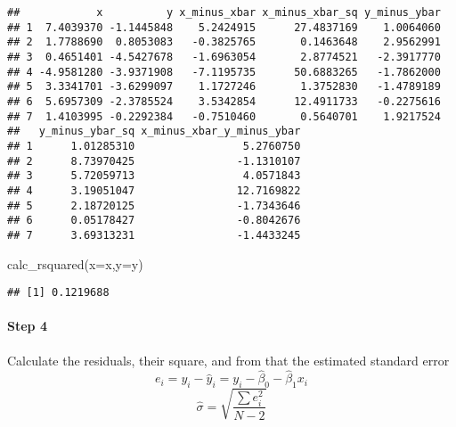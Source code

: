\documentclass[
]{article}
\newenvironment{Shaded}{\begin{snugshade}}{\end{snugshade}}
\newcommand{\AttributeTok}[1]{\textcolor[rgb]{0.77,0.63,0.00}{#1}}
\newcommand{\CommentTok}[1]{\textcolor[rgb]{0.56,0.35,0.01}{\textit{#1}}}
\newcommand{\FunctionTok}[1]{\textcolor[rgb]{0.00,0.00,0.00}{#1}}
\newcommand{\NormalTok}[1]{#1}
\begin{document}
\begin{verbatim}
##            x          y x_minus_xbar x_minus_xbar_sq y_minus_ybar
## 1  7.4039370 -1.1445848    5.2424915      27.4837169    1.0064060
## 2  1.7788690  0.8053083   -0.3825765       0.1463648    2.9562991
## 3  0.4651401 -4.5427678   -1.6963054       2.8774521   -2.3917770
## 4 -4.9581280 -3.9371908   -7.1195735      50.6883265   -1.7862000
## 5  3.3341701 -3.6299097    1.1727246       1.3752830   -1.4789189
## 6  5.6957309 -2.3785524    3.5342854      12.4911733   -0.2275616
## 7  1.4103995 -0.2292384   -0.7510460       0.5640701    1.9217524
##   y_minus_ybar_sq x_minus_xbar_y_minus_ybar
## 1      1.01285310                 5.2760750
## 2      8.73970425                -1.1310107
## 3      5.72059713                 4.0571843
## 4      3.19051047                12.7169822
## 5      2.18720125                -1.7343646
## 6      0.05178427                -0.8042676
## 7      3.69313231                -1.4433245
\end{verbatim}

\begin{Shaded}
\begin{Highlighting}[]
\FunctionTok{calc\_rsquared}\NormalTok{(}\AttributeTok{x=}\NormalTok{x,}\AttributeTok{y=}\NormalTok{y)}
\end{Highlighting}
\end{Shaded}

\begin{verbatim}
## [1] 0.1219688
\end{verbatim}

\begin{Shaded}
\end{Shaded}

\hypertarget{step-4}{%
\paragraph{Step 4}\label{step-4}}

Calculate the residuals, their square, and from that the estimated
standard error \[e_i=y_i-\hat y_i=y_i-\hat\beta_0-\hat\beta_1 x_i\]
\[\hat\sigma=\sqrt{\frac{\sum e_i^2}{N-2}}\]
\end{document}
